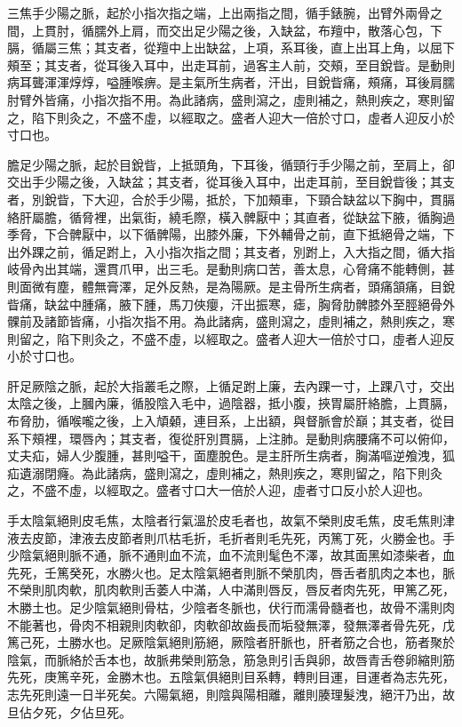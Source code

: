 三焦手少陽之脈，起於小指次指之端，上出兩指之間，循手錶腕，出臂外兩骨之間，上貫肘，循臑外上肩，而交出足少陽之後，入缺盆，布羶中，散落心包，下膈，循屬三焦；其支者，從羶中上出缺盆，上項，系耳後，直上出耳上角，以屈下頰至；其支者，從耳後入耳中，出走耳前，過客主人前，交頰，至目銳眥。是動則病耳聾渾渾焞焞，嗌腫喉痹。是主氣所生病者，汗出，目銳眥痛，頰痛，耳後肩臑肘臂外皆痛，小指次指不用。為此諸病，盛則瀉之，虛則補之，熱則疾之，寒則留之，陷下則灸之，不盛不虛，以經取之。盛者人迎大一倍於寸口，虛者人迎反小於寸口也。

膽足少陽之脈，起於目銳眥，上抵頭角，下耳後，循頸行手少陽之前，至肩上，卻交出手少陽之後，入缺盆；其支者，從耳後入耳中，出走耳前，至目銳眥後；其支者，別銳眥，下大迎，合於手少陽，抵於，下加頰車，下頸合缺盆以下胸中，貫膈絡肝屬膽，循脅裡，出氣街，繞毛際，橫入髀厭中；其直者，從缺盆下腋，循胸過季脅，下合髀厭中，以下循髀陽，出膝外廉，下外輔骨之前，直下抵絕骨之端，下出外踝之前，循足跗上，入小指次指之間；其支者，別跗上，入大指之間，循大指岐骨內出其端，還貫爪甲，出三毛。是動則病口苦，善太息，心脅痛不能轉側，甚則面微有塵，體無膏澤，足外反熱，是為陽厥。是主骨所生病者，頭痛頷痛，目銳眥痛，缺盆中腫痛，腋下腫，馬刀俠癭，汗出振寒，瘧，胸脅肋髀膝外至脛絕骨外髁前及諸節皆痛，小指次指不用。為此諸病，盛則瀉之，虛則補之，熱則疾之，寒則留之，陷下則灸之，不盛不虛，以經取之。盛者人迎大一倍於寸口，虛者人迎反小於寸口也。

肝足厥陰之脈，起於大指叢毛之際，上循足跗上廉，去內踝一寸，上踝八寸，交出太陰之後，上膕內廉，循股陰入毛中，過陰器，抵小腹，挾胃屬肝絡膽，上貫膈，布脅肋，循喉嚨之後，上入頏顙，連目系，上出額，與督脈會於巔；其支者，從目系下頰裡，環唇內；其支者，復從肝別貫膈，上注肺。是動則病腰痛不可以俯仰，丈夫疝，婦人少腹腫，甚則嗌干，面塵脫色。是主肝所生病者，胸滿嘔逆飧洩，狐疝遺溺閉癃。為此諸病，盛則瀉之，虛則補之，熱則疾之，寒則留之，陷下則灸之，不盛不虛，以經取之。盛者寸口大一倍於人迎，虛者寸口反小於人迎也。

手太陰氣絕則皮毛焦，太陰者行氣溫於皮毛者也，故氣不榮則皮毛焦，皮毛焦則津液去皮節，津液去皮節者則爪枯毛折，毛折者則毛先死，丙篤丁死，火勝金也。手少陰氣絕則脈不通，脈不通則血不流，血不流則髦色不澤，故其面黑如漆柴者，血先死，壬篤癸死，水勝火也。足太陰氣絕者則脈不榮肌肉，唇舌者肌肉之本也，脈不榮則肌肉軟，肌肉軟則舌萎人中滿，人中滿則唇反，唇反者肉先死，甲篤乙死，木勝土也。足少陰氣絕則骨枯，少陰者冬脈也，伏行而濡骨髓者也，故骨不濡則肉不能著也，骨肉不相親則肉軟卻，肉軟卻故齒長而垢發無澤，發無澤者骨先死，戊篤己死，土勝水也。足厥陰氣絕則筋絕，厥陰者肝脈也，肝者筋之合也，筋者聚於陰氣，而脈絡於舌本也，故脈弗榮則筋急，筋急則引舌與卵，故唇青舌卷卵縮則筋先死，庚篤辛死，金勝木也。五陰氣俱絕則目系轉，轉則目運，目運者為志先死，志先死則遠一日半死矣。六陽氣絕，則陰與陽相離，離則腠理髮洩，絕汗乃出，故旦佔夕死，夕佔旦死。

